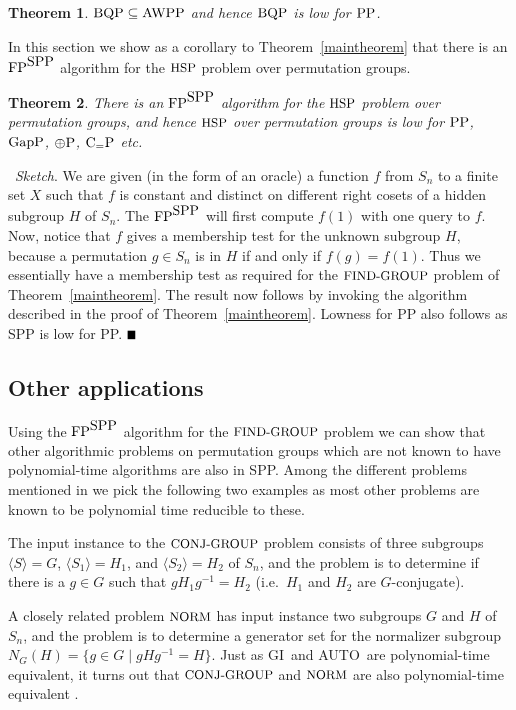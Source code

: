 \documentclass{article}
\newtheorem{theorem}{Theorem}[section]
\newcommand{\bproof}{\noindent{\it Proof}}
\newcommand{\eproof}{\hspace*{\fill}$\rule{2mm}{2mm}$~~~~~\bigskip}
\newenvironment{psketch}{\bproof~{\it Sketch}. }{\eproof}
\newcommand{\PP}{\mbox{\rm PP}}
\newcommand{\GapP}{\mbox{\rm GapP}}
\newcommand{\FP}{\mbox{\rm FP}}
\newcommand{\ParityP}{\mbox{$\oplus$\rm P}}
\newcommand{\SPP}{\mbox{\rm SPP}}
\newcommand{\CeqP}{\mbox{\rm C$_=$P}}
\newcommand{\BQP}{\mbox{\rm BQP}}
\newcommand{\AWPP}{\mbox{\rm AWPP}}
\newcommand{\AUTO}{\mbox{\small\rm AUTO}}
\newcommand{\FINDGROUP}{\mbox{\small\rm FIND{-}GROUP}}
\newcommand{\HSP}{\mbox{\small\rm HSP}}
\newcommand{\GI}{{\rm{GI}}}
\newcommand{\CONJGP}{\mbox{\small\rm CONJ{-}GROUP}}
\newcommand{\NORM}{\mbox{\small\rm NORM}}
\renewcommand{\angle}[1]{\langle #1\rangle}
\begin{document}
\begin{theorem}{\rm\cite{fortnow98complexity}}
$\BQP\subseteq\AWPP$ and hence $\BQP$ is low for $\PP$.
\end{theorem}

In this section we show as a corollary to Theorem~\ref{maintheorem}
that there is an $\FP^{\SPP}$ algorithm for the $\HSP$ problem over
permutation groups.

\begin{theorem}
  There is an $\FP^{\SPP}$ algorithm for the $\HSP$ problem over
  permutation groups, and hence $\HSP$ over permutation groups is low
  for $\PP$, $\GapP$, $\ParityP$, $\CeqP$ etc.
\end{theorem}

\begin{psketch}
  We are given (in the form of an oracle) a function $f$ from $S_n$ to
  a finite set $X$ such that $f$ is constant and distinct on different
  right cosets of a hidden subgroup $H$ of $S_n$. The $\FP^{\SPP}$
  will first compute $f(1)$ with one query to $f$. Now, notice that
  $f$ gives a membership test for the unknown subgroup $H$, because a
  permutation $g\in S_n$ is in $H$ if and only if $f(g)=f(1)$. Thus we
  essentially have a membership test as required for the $\FINDGROUP$
  problem of Theorem~\ref{maintheorem}. The result now follows by
  invoking the algorithm described in the proof of
  Theorem~\ref{maintheorem}. Lowness for PP also follows as SPP is low
  for PP.
\end{psketch}

\subsection{ Other applications}

Using the $\FP^{\SPP}$ algorithm for the $\FINDGROUP$ problem we can
show that other algorithmic problems on permutation groups 
\cite{luks93permutation} which are not known to have polynomial-time algorithms
are also in SPP. Among the different problems mentioned in
\cite{luks93permutation} we pick the following two examples as most other 
problems are known to be polynomial time reducible to these.

The input instance to the $\CONJGP$ problem consists of three
subgroups $\angle{S}=G$, $\angle{S_1}=H_1$, and $\angle{S_2}=H_2$ of
$S_n$, and the problem is to determine if there is a $g\in G$ such
that $gH_1g^{-1}=H_2$ (i.e.\ $H_1$ and $H_2$ are $G$-conjugate).

A closely related problem $\NORM$ has input instance two subgroups $G$
and $H$ of $S_n$, and the problem is to determine a generator set for
the normalizer subgroup $N_G(H)=\{g\in G\mid gHg^{-1}=H\}$. Just as
\GI\ and \AUTO\ are polynomial-time equivalent, it turns out that
$\CONJGP$ and $\NORM$ are also polynomial-time equivalent
\cite{luks93permutation}.
\end{document}
